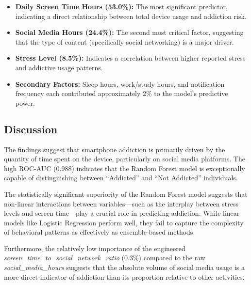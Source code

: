 \begin{itemize}
    \item \textbf{Daily Screen Time Hours (53.0\%):} The most significant predictor, indicating a direct relationship between total device usage and addiction risk.
    \item \textbf{Social Media Hours (24.4\%):} The second most critical factor, suggesting that the type of content (specifically social networking) is a major driver.
    \item \textbf{Stress Level (8.5\%):} Indicates a correlation between higher reported stress and addictive usage patterns.
    \item \textbf{Secondary Factors:} Sleep hours, work/study hours, and notification frequency each contributed approximately 2\% to the model's predictive power.
\end{itemize}

\subsection{Discussion}
The findings suggest that smartphone addiction is primarily driven by the quantity of time spent on the device, particularly on social media platforms. The high ROC-AUC (0.988) indicates that the Random Forest model is exceptionally capable of distinguishing between ``Addicted'' and ``Not Addicted'' individuals.

The statistically significant superiority of the Random Forest model suggests that non-linear interactions between variables—such as the interplay between stress levels and screen time—play a crucial role in predicting addiction. While linear models like Logistic Regression perform well, they fail to capture the complexity of behavioral patterns as effectively as ensemble-based methods.

Furthermore, the relatively low importance of the engineered \textit{screen\_time\_to\_social\_network\_ratio} (0.3\%) compared to the raw \textit{social\_media\_hours} suggests that the absolute volume of social media usage is a more direct indicator of addiction than its proportion relative to other activities.
